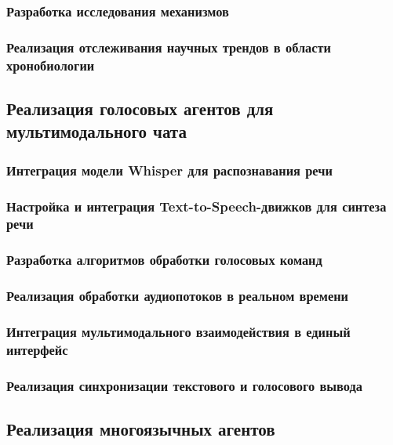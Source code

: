 \documentclass{syksu-coursework}
\begin{document}
\subsubsection{Разработка исследования механизмов}

\subsubsection{Реализация отслеживания научных трендов в области хронобиологии}

\subsection{Реализация голосовых агентов для мультимодального чата}

\subsubsection{Интеграция модели Whisper для распознавания речи}

\subsubsection{Настройка и интеграция Text-to-Speech-движков для синтеза речи}

\subsubsection{Разработка алгоритмов обработки голосовых команд}

\subsubsection{Реализация обработки аудиопотоков в реальном времени}

\subsubsection{Интеграция мультимодального взаимодействия в единый интерфейс}

\subsubsection{Реализация синхронизации текстового и голосового вывода}

\subsection{Реализация многоязычных агентов}
\end{document}
